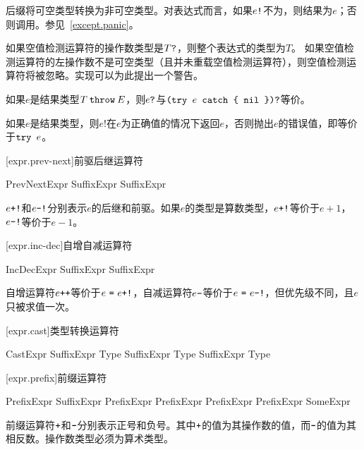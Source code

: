 \pnum
后缀\tcode{!}将可空类型转换为非可空类型。对表达式而言，如果$e\texttt{!}$不为，则结果为$e$；否则调用。参见~\ref{except.panic}。

\pnum
如果空值检测运算符的操作数类型是$T\texttt{?}$，则整个表达式的类型为$T$。
如果空值检测运算符的左操作数不是可空类型（且并未重载空值检测运算符），则空值检测运算符将被忽略。实现可以为此提出一个警告。

\pnum
如果$e$是结果类型$T\mathbin{\texttt{throw}}E$，则$e\texttt{?}$与$\texttt{(try }e\texttt{ catch \{ nil \})?}$等价。

\pnum
如果$e$是结果类型，则$e!$在$e$为正确值的情况下返回$e$，否则抛出$e$的错误值，即等价于$\texttt{try }e$。

[expr.prev-next]{前驱后继运算符}

\begin{bnf}{PrevNextExpr}
    SuffixExpr \terminal{+!} \br
    SuffixExpr \terminal{-!}
\end{bnf}

\pnum
$e\texttt{+!}$和$e\texttt{-!}$分别表示$e$的后继和前驱。如果$e$的类型是算数类型，$e\texttt{+!}$等价于$e+1$，$e\texttt{-!}$等价于$e-1$。

[expr.inc-dec]{自增自减运算符}

\begin{bnf}{IncDecExpr}
    SuffixExpr \terminal{++} \br
    SuffixExpr \terminal{--}
\end{bnf}

\pnum
自增运算符$e\texttt{++}$等价于$e\ \texttt{=}\ e\texttt{+!}$，自减运算符$e\texttt{--}$等价于$e\ \tcode{=}\ e\tcode{-!}$，但优先级不同，且$e$只被求值一次。

[expr.cast]{类型转换运算符}

\begin{bnf}{CastExpr}
    SuffixExpr  Type \br
    SuffixExpr   Type \br
    SuffixExpr  \terminal{!} Type
\end{bnf}

[expr.prefix]{前缀运算符}

\begin{bnf}{PrefixExpr}
    SuffixExpr \br
    \terminal{+} PrefixExpr \br
    \terminal{-} PrefixExpr \br
    \terminal{!} PrefixExpr \br
     PrefixExpr \br
    SomeExpr
\end{bnf}

\pnum
前缀运算符$\mathbin{\texttt{+}}$和$\mathbin{\texttt{-}}$分别表示正号和负号。其中$\mathbin{\texttt{+}}$的值为其操作数的值，而$\mathbin{\texttt{-}}$的值为其相反数。操作数类型必须为算术类型。

